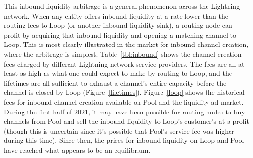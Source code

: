 \documentclass[10pt,twocolumn]{article}
\begin{document}
This inbound liquidity arbitrage is a general phenomenon across
the Lightning network.
When any entity offers inbound liquidity at a rate lower than
the routing fees to Loop (or another inbound liquidity sink),
a routing node can profit by acquiring that inbound liquidity and
opening a matching channel to Loop.
This is most clearly illustrated in the market for
inbound channel creation, where the arbitrage is simplest.
Table~\ref{tbl:inbound} shows the channel creation fees
charged by different Lightning network service providers.
The fees are all at least as high as what one could expect
to make by routing to Loop, and the lifetimes are all
sufficient to exhaust a channel's entire capacity
before the channel is closed by Loop (Figure~\ref{lifetimes}).
Figure~\ref{loop} shows the historical fees for inbound channel creation
available on Pool and the liquidity ad market.
During the first half of 2021, it may have been possible for
routing nodes to buy channels from Pool and sell the inbound
liquidity to Loop's customer's at a profit
(though this is uncertain since it's possible that
Pool's service fee was higher during this time).
Since then, the prices for inbound liquidity on Loop and Pool
have reached what appears to be an equilibrium.
\end{document}
